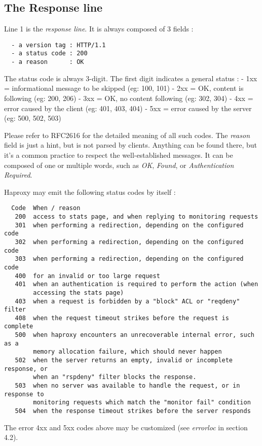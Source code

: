 
\subsection{The Response line}

Line 1 is the \emph{response line}. It is always composed of 3 fields :

\begin{verbatim}
  - a version tag : HTTP/1.1
  - a status code : 200
  - a reason      : OK
\end{verbatim}


The status code is always 3-digit. The first digit indicates a general status :
 - 1xx = informational message to be skipped (eg: 100, 101)
 - 2xx = OK, content is following   (eg: 200, 206)
 - 3xx = OK, no content following   (eg: 302, 304)
 - 4xx = error caused by the client (eg: 401, 403, 404)
 - 5xx = error caused by the server (eg: 500, 502, 503)


Please refer to RFC2616 for the detailed meaning of all such codes. The
\emph{reason} field is just a hint, but is not parsed by clients. Anything can be
found there, but it's a common practice to respect the well-established
messages. It can be composed of one or multiple words, such as \emph{OK}, \emph{Found},
or \emph{Authentication Required}.


Haproxy may emit the following status codes by itself :

\begin{verbatim}
  Code  When / reason
   200  access to stats page, and when replying to monitoring requests
   301  when performing a redirection, depending on the configured code
   302  when performing a redirection, depending on the configured code
   303  when performing a redirection, depending on the configured code
   400  for an invalid or too large request
   401  when an authentication is required to perform the action (when
        accessing the stats page)
   403  when a request is forbidden by a "block" ACL or "reqdeny" filter
   408  when the request timeout strikes before the request is complete
   500  when haproxy encounters an unrecoverable internal error, such as a
        memory allocation failure, which should never happen
   502  when the server returns an empty, invalid or incomplete response, or
        when an "rspdeny" filter blocks the response.
   503  when no server was available to handle the request, or in response to
        monitoring requests which match the "monitor fail" condition
   504  when the response timeout strikes before the server responds
\end{verbatim}


The error 4xx and 5xx codes above may be customized (see \emph{errorloc} in section
4.2).

